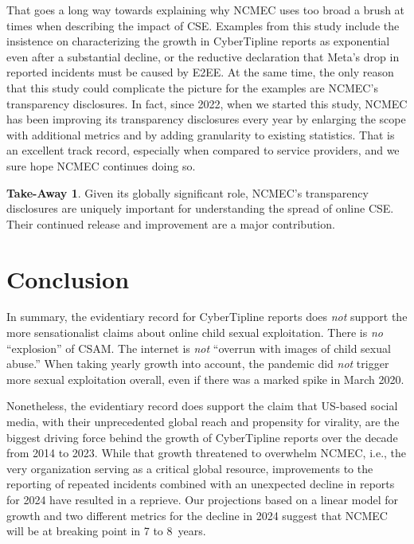 \documentclass[anonymous,nonacm,screen,12pt]{acmart}
\newcommand\V[1]{{#1}}
\newcommand\V[1]{\textsc{\MakeLowercase{#1}}}
\theoremstyle{definition}
\newtheorem{takeout}{Take-Away}
\begin{document}
That goes a long way towards explaining why \V{NCMEC} uses too broad a brush at
times when describing the impact of \V{CSE}. Examples from this study include
the insistence on characterizing the growth in CyberTipline reports as
exponential even after a substantial decline, or the reductive declaration that
Meta's drop in reported incidents must be caused by \V{E2EE}. At the same time,
the only reason that this study could complicate the picture for the examples
are \V{NCMEC}'s transparency disclosures. In fact, since 2022, when we started
this study, \V{NCMEC} has been improving its transparency disclosures every year
by enlarging the scope with additional metrics and by adding granularity to
existing statistics. That is an excellent track record, especially when compared
to service providers, and we sure hope \V{NCMEC} continues doing so.

\begin{takeout}
Given its globally significant role, \V{NCMEC}'s transparency disclosures are
uniquely important for understanding the spread of online \V{CSE}. Their
continued release and improvement are a major contribution.
\end{takeout}



\section{Conclusion}
\label{sec:conclusion}

In summary, the evidentiary record for CyberTipline reports does \emph{not}
support the more sensationalist claims about online child sexual exploitation.
There is \emph{no} ``explosion'' of \V{CSAM}. The internet is \emph{not}
``overrun with images of child sexual abuse.'' When taking yearly growth into
account, the pandemic did \emph{not} trigger more sexual exploitation overall,
even if there was a marked spike in March 2020.

Nonetheless, the evidentiary record does support the claim that \V{US}-based
social media, with their unprecedented global reach and propensity for virality,
are the biggest driving force behind the growth of CyberTipline reports over the
decade from 2014 to 2023. While that growth threatened to overwhelm \V{NCMEC},
i.e., the very organization serving as a critical global resource, improvements
to the reporting of repeated incidents combined with an unexpected decline in
reports for 2024 have resulted in a reprieve. Our projections based on a linear
model for growth and two different metrics for the decline in 2024 suggest that
\V{NCMEC} will be at breaking point in 7 to 8~years.
\end{document}
